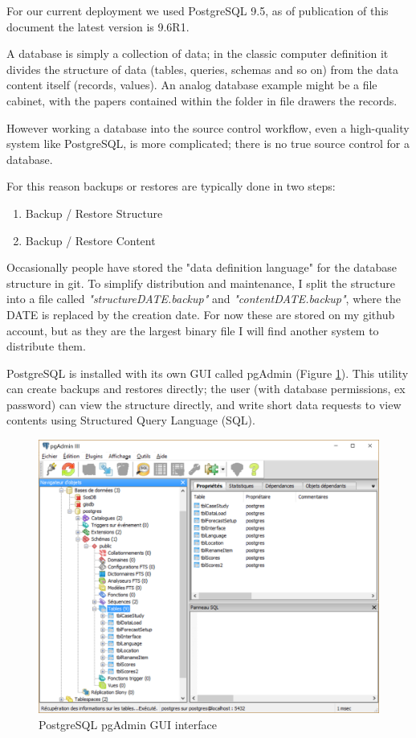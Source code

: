 \documentclass[logos,parttoc,morelanguage=french,morelanguage=german]{orsay-memoire}
\begin{document}
For our current deployment we used PostgreSQL 9.5, as of publication of this document the latest version is 9.6R1.

A database is simply a collection of data; in the classic computer definition it divides the structure of data (tables, queries, schemas and so on) from the data content itself (records, values). An analog database example might be a file cabinet, with the papers contained within the folder in file drawers the records.

However working a database into the source control workflow, even a high-quality system like PostgreSQL, is more complicated; there is no true source control for a database.

For this reason backups or restores are typically done in two steps:
\begin{enumerate}
\item Backup / Restore Structure
\item Backup / Restore Content
\end{enumerate}

Occasionally people have stored the "data definition language" for the database structure in git. To simplify distribution and maintenance, I split the structure into a file called \textit{"structureDATE.backup"} and \textit{"contentDATE.backup"}, where the DATE is replaced by the creation date. For now these are stored on my github account, but as they are the largest binary file I will find another system to distribute them.

PostgreSQL is installed with its own GUI called pgAdmin (Figure \ref{fig:pgAdmin}). This utility can create backups and restores directly; the user (with database permissions, ex password) can view the structure directly, and write short data requests to view contents using Structured Query Language (SQL).

\begin{figure}[H]
\centering
\includegraphics[width=0.7\linewidth]{images/pgAdmin1.png}
  \caption{PostgreSQL pgAdmin GUI interface}
  \label{fig:pgAdmin}
\end{figure}
\end{document}
